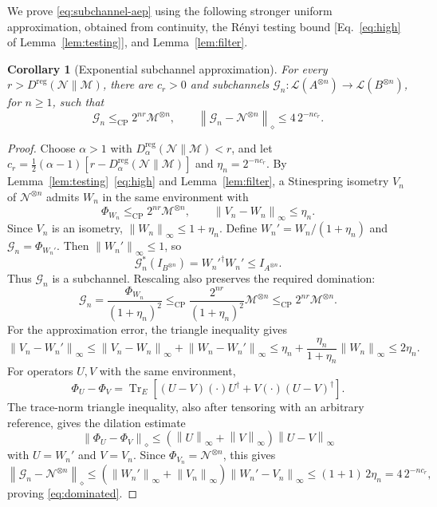 \documentclass[11pt,letterpaper]{article}
\numberwithin{equation}{section}
\newtheorem{corollary}[theorem]{Corollary}
\newcommand{\N}{\mathcal N}
\newcommand{\M}{\mathcal M}
\newcommand{\Tr}{\operatorname{Tr}}
\newcommand{\reg}{\mathrm{reg}}
\newcommand{\cp}{\mathrm{CP}}
\newcommand{\Dt}{D}
\newcommand{\cL}{\mathcal L}
\newcommand{\norm}[1]{\left\lVert#1\right\rVert}
\begin{document}
We prove \eqref{eq:subchannel-aep} using the following stronger uniform approximation, obtained from continuity, the R\'enyi testing bound [Eq.~\eqref{eq:high} of Lemma~\ref{lem:testing}], and Lemma~\ref{lem:filter}.
\begin{corollary}[Exponential subchannel approximation]\label{cor:subchannel}
For every $r>D^{\reg}(\N\|\M)$, there are $c_r>0$ and subchannels
$\mathcal G_n:\cL(A^{\otimes n})\to\cL(B^{\otimes n})$, for $n\ge1$, such that
\begin{equation}\label{eq:dominated}
 \mathcal G_n\le_{\cp}2^{nr}\M^{\otimes n},\qquad
 \norm{\mathcal G_n-\N^{\otimes n}}_\diamond\le4\,2^{-nc_r}.
\end{equation}
\end{corollary}
\begin{proof}
Choose $\alpha>1$ with $\Dt_\alpha^{\reg}(\N\|\M)<r$, and let
$c_r=\tfrac12(\alpha-1)[r-\Dt_\alpha^{\reg}(\N\|\M)]$ and $\eta_n=2^{-nc_r}$.
By Lemma~\ref{lem:testing}~\eqref{eq:high} and Lemma~\ref{lem:filter}, a Stinespring isometry $V_n$ of $\N^{\otimes n}$ admits $W_n$ in the same environment with
\[
 \Phi_{W_n}\le_{\cp}2^{nr}\M^{\otimes n},\qquad
 \norm{V_n-W_n}_\infty\le\eta_n.
\]
Since $V_n$ is an isometry, $\norm{W_n}_\infty\le1+\eta_n$. Define $W_n'=W_n/(1+\eta_n)$ and $\mathcal G_n=\Phi_{W_n'}$. Then $\norm{W_n'}_\infty\le1$, so
\[
 \mathcal G_n^*(I_{B^{\otimes n}})=W_n'^\dagger W_n'\le I_{A^{\otimes n}}.
\]
Thus $\mathcal G_n$ is a subchannel. Rescaling also preserves the required domination:
\[
 \mathcal G_n=\frac{\Phi_{W_n}}{(1+\eta_n)^2}
 \le_{\cp}\frac{2^{nr}}{(1+\eta_n)^2}\M^{\otimes n}
 \le_{\cp}2^{nr}\M^{\otimes n}.
\]
For the approximation error, the triangle inequality gives
\[
 \norm{V_n-W_n'}_\infty
 \le\norm{V_n-W_n}_\infty+\norm{W_n-W_n'}_\infty
 \le\eta_n+\frac{\eta_n}{1+\eta_n}\norm{W_n}_\infty
 \le2\eta_n.
\]
For operators $U,V$ with the same environment,
\[
 \Phi_U-\Phi_V
 =\Tr_E\!\left[(U-V)(\cdot)U^\dagger+V(\cdot)(U-V)^\dagger\right].
\]
The trace-norm triangle inequality, also after tensoring with an arbitrary reference, gives the dilation estimate \cite{KSW}
\[
 \norm{\Phi_U-\Phi_V}_\diamond
 \le(\norm U_\infty+\norm V_\infty)\norm{U-V}_\infty
\]
with $U=W_n'$ and $V=V_n$. Since $\Phi_{V_n}=\N^{\otimes n}$, this gives
\[
 \norm{\mathcal G_n-\N^{\otimes n}}_\diamond
 \le(\norm{W_n'}_\infty+\norm{V_n}_\infty)\norm{W_n'-V_n}_\infty
 \le(1+1)\,2\eta_n=4\,2^{-nc_r},
\]
proving \eqref{eq:dominated}.
\end{proof}
\end{document}
